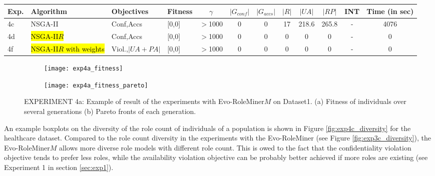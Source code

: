 \begin{table}[H]
\begin{adjustbox}{width=\textwidth}
		\begin{tabular}{|l|l|l|l|c|c|c|c|c|c|c|c|}
			\hline
			\rowcolor{myGray} 
			\textbf{Exp.} & \textbf{Algorithm} & \textbf{Objectives} & \textbf{Fitness} & $\gamma$ & \textbf{$|G_{conf}|$} & \textbf{$|G_{accs}|$} & \textbf{$|R|$} & \textbf{$|UA|$} & \textbf{$|RP|$} & \textbf{INT} & \textbf{Time (in sec)}\\ \hline
			4c & NSGA-II & Conf,Accs &   [0,0] &   $>$1000 &0   &   0 & 17   &   218.6   &   265.8   &   -    & 4076\\ \hline
			4d & \hl{NSGA-II$R$} & Conf,Accs   & [0,0] &   $>$1000 &   0   &   0 & 0   &   0   &   0   &   -    & 0\\ \hline
			4f & \hl{NSGA-II$R$ with weights} & Viol.,$|UA+PA|$ & [0,0] &   $>$1000 &   0   &   0 & 0   &   0   &   0   &   -    & 0\\ \hline		
		\end{tabular}
	\end{adjustbox}
\end{table}
\newpage
\begin{figure}[H]
	\centering
	\begin{subfigure}{\textwidth}
		\centering
		\texttt{[image: exp4a\_fitness]}
		\caption{}
		\label{fig:exp4a_fitness_A}
	\end{subfigure}
	\begin{subfigure}{\textwidth}
		\centering
		\texttt{[image: exp4a\_fitness\_pareto]}
		\caption{}
		\label{fig:exp4a_fitness_B}
	\end{subfigure}
	\caption{EXPERIMENT 4a: Example of result of the experiments with Evo-RoleMiner$M$ on Dataset1. (a) Fitness of individuals over several generations (b) Pareto fronts of each generation.}
	\label{fig:exp4a_fitness}
\end{figure}

An example boxplots on the diversity of the role count of individuals of a population is shown in Figure \ref{fig:exp4c_diversity} for the healthcare dataset. Compared to the role count diversity in the experiments with the Evo-RoleMiner (see Figure \ref{fig:exp3c_diversity}), the Evo-RoleMiner$M$ allows more diverse role models with different role count. This is owed to the fact that the confidentiality violation objective tends to prefer less roles, while the availability violation objective can be probably better achieved if more roles are existing (see Experiment 1 in section \ref{sec:exp1}).

